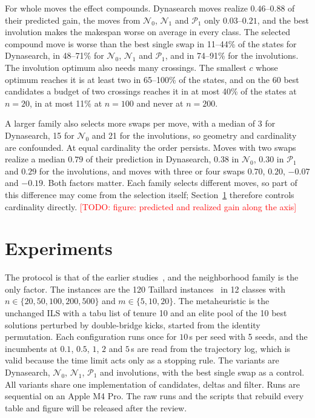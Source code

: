 \documentclass[10pt,twocolumn]{article}
\newcommand{\todo}[1]{\textcolor{red}{[TODO: #1]}}
\newcommand{\N}{\mathcal{N}}
\newcommand{\Pa}{\mathcal{P}}
\begin{document}
For whole moves the effect compounds. Dynasearch moves realize
$0.46$--$0.88$ of their predicted gain, the moves from $\N_0$, $\N_1$
and $\Pa_1$ only $0.03$--$0.21$, and the best involution makes the
makespan worse on average in every class. The selected compound move is
worse than the best single swap in 11--44\% of the states for
Dynasearch, in 48--71\% for $\N_0$, $\N_1$ and $\Pa_1$, and in 74--91\%
for the involutions. The involution optimum also needs many crossings.
The smallest $c$ whose optimum reaches it is at least two in 65--100\%
of the states, and on the 60 best candidates a budget of two crossings
reaches it in at most 40\% of the states at $n=20$, in at most 11\% at
$n=100$ and never at $n=200$.

A larger family also selects more swaps per move, with a median of 3
for Dynasearch, 15 for $\N_0$ and 21 for the involutions, so geometry
and cardinality are confounded. At equal cardinality the order
persists. Moves with two swaps realize a median $0.79$ of their
prediction in Dynasearch, $0.38$ in $\N_0$, $0.30$ in $\Pa_1$ and $0.29$
for the involutions, and moves with three or four swaps $0.70$, $0.20$,
$-0.07$ and $-0.19$. Both factors matter. Each family selects different
moves, so part of this difference may come from the selection itself;
Section~\ref{sec:exp} therefore controls cardinality directly.
\todo{figure: predicted and realized gain along the axis}

\section{Experiments}\label{sec:exp}

The protocol is that of the earlier studies~\cite{windowed_own}, and the
neighborhood family is the only factor. The
instances are the 120 Taillard instances~\cite{taillard1993} in 12
classes with $n\in\{20,50,100,200,500\}$ and $m\in\{5,10,20\}$. The
metaheuristic is the unchanged ILS with a tabu list of tenure 10 and an
elite pool of the 10 best solutions perturbed by double-bridge kicks,
started from the identity permutation. Each configuration runs once for
$10$\,s per seed with 5 seeds, and the incumbents at $0.1$, $0.5$, $1$,
$2$ and $5$\,s are read from the trajectory log, which is valid because
the time limit acts only as a stopping rule. The variants are
Dynasearch, $\N_0$, $\N_1$, $\Pa_1$ and involutions, with the best
single swap as a control. All
variants share one implementation of candidates, deltas and filter. Runs
are sequential on an Apple M4 Pro. The raw runs and the scripts that
rebuild every table and figure will be released after the review.
\end{document}
